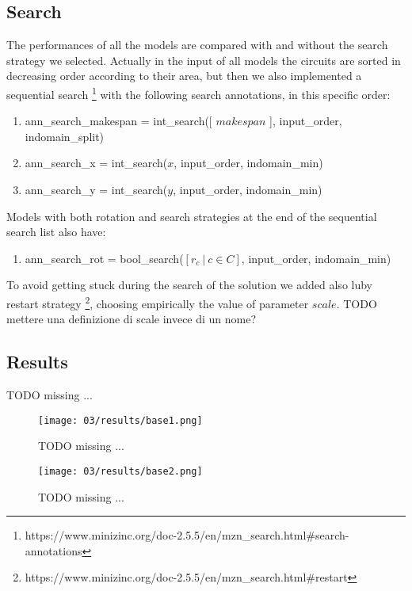 
\subsection{Search}
The performances of all the models are compared with and without the search strategy we selected.
Actually in the input of all models the circuits are sorted in decreasing order according to their area,
but then we also implemented a sequential search
\footnote[2]{https://www.minizinc.org/doc-2.5.5/en/mzn\_search.html\#search-annotations}
with the following search annotations, in this specific order:
\begin{enumerate}
  \item ann\_search\_makespan = int\_search([ $makespan$ ], input\_order, indomain\_split)
  \item ann\_search\_x = int\_search($x$, input\_order, indomain\_min)
  \item ann\_search\_y = int\_search($y$, input\_order, indomain\_min)
\end{enumerate}

Models with both rotation and search strategies at the end of the sequential search
list also have:
\begin{enumerate}[resume]
  \item ann\_search\_rot = bool\_search($[r_c\ |\ c \in C]$, input\_order, indomain\_min)
\end{enumerate}

To avoid getting stuck during the search of the solution we added also luby restart strategy
\footnote[3]{https://www.minizinc.org/doc-2.5.5/en/mzn\_search.html\#restart},
choosing empirically the value of parameter $scale$.
\colorbox{BurntOrange}{TODO mettere una definizione di scale invece di un nome?}




\subsection{Results}
  \colorbox{BurntOrange}{TODO missing ...}

  \begin{figure}[H]
    \centering
    \texttt{[image: 03/results/base1.png]}
    \caption{
      \colorbox{BurntOrange}{TODO missing ...}
    }
    \label{fig:CP_results_base1}
  \end{figure}
  \begin{figure}[H]
    \centering
    \texttt{[image: 03/results/base2.png]}
    \caption{
      \colorbox{BurntOrange}{TODO missing ...}
    }
    \label{fig:CP_results_base2}
  \end{figure}

